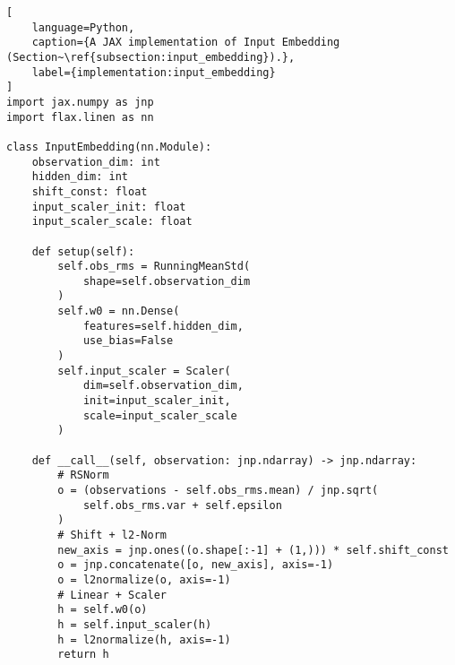 \begin{lstlisting}[
    language=Python,
    caption={A JAX implementation of Input Embedding (Section~\ref{subsection:input_embedding}).},
    label={implementation:input_embedding}
]
import jax.numpy as jnp
import flax.linen as nn

class InputEmbedding(nn.Module):
    observation_dim: int
    hidden_dim: int
    shift_const: float
    input_scaler_init: float
    input_scaler_scale: float

    def setup(self):
        self.obs_rms = RunningMeanStd(
            shape=self.observation_dim
        )
        self.w0 = nn.Dense(
            features=self.hidden_dim,
            use_bias=False
        )
        self.input_scaler = Scaler(
            dim=self.observation_dim,
            init=input_scaler_init,
            scale=input_scaler_scale
        )
    
    def __call__(self, observation: jnp.ndarray) -> jnp.ndarray:
        # RSNorm
        o = (observations - self.obs_rms.mean) / jnp.sqrt(
            self.obs_rms.var + self.epsilon
        )
        # Shift + l2-Norm
        new_axis = jnp.ones((o.shape[:-1] + (1,))) * self.shift_const
        o = jnp.concatenate([o, new_axis], axis=-1)
        o = l2normalize(o, axis=-1)
        # Linear + Scaler
        h = self.w0(o)
        h = self.input_scaler(h)
        h = l2normalize(h, axis=-1)
        return h
\end{lstlisting}
